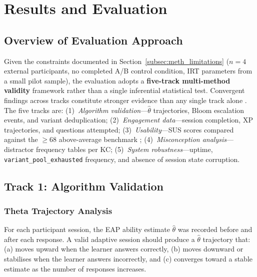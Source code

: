 \chapter{Results and Evaluation}
\label{ch:results}

\section{Overview of Evaluation Approach}
\label{sec:results_overview}

Given the constraints documented in Section~\ref{subsec:meth_limitations}
($n = 4$ external participants, no completed A/B control condition, IRT
parameters from a small pilot sample), the evaluation adopts a
\textbf{five-track multi-method validity} framework rather than a single
inferential statistical test. Convergent findings across tracks constitute
stronger evidence than any single track alone \parencite{woolf2010}. The five
tracks are: (1)~\textit{Algorithm validation}---$\hat{\theta}$ trajectories,
Bloom escalation events, and variant deduplication; (2)~\textit{Engagement
data}---session completion, XP trajectories, and questions attempted;
(3)~\textit{Usability}---SUS scores compared against the $\geq 68$
above-average benchmark \parencite{bangor2008}; (4)~\textit{Misconception
analysis}---distractor frequency tables per KC; (5)~\textit{System
robustness}---uptime, \texttt{variant\_pool\_exhausted} frequency, and absence
of session state corruption.

\section{Track 1: Algorithm Validation}
\label{sec:results_algorithm}

\subsection{Theta Trajectory Analysis}
\label{subsec:results_theta}

For each participant session, the EAP ability estimate $\hat{\theta}$ was
recorded before and after each response. A valid adaptive session should
produce a $\hat{\theta}$ trajectory that: (a) moves upward when the learner
answers correctly, (b) moves downward or stabilises when the learner answers
incorrectly, and (c) converges toward a stable estimate as the number of
responses increases.

